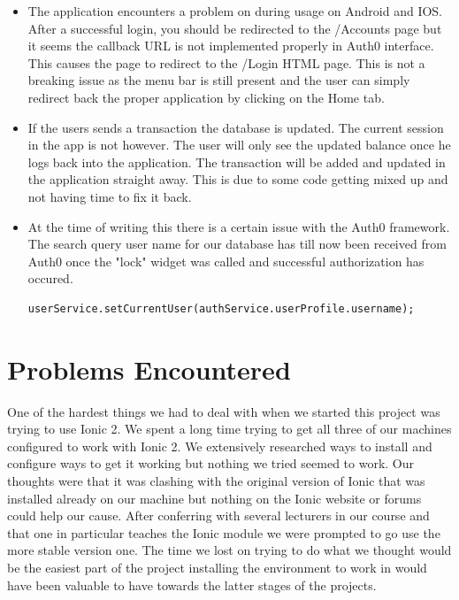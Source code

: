 \begin{itemize}
    \item The application encounters a problem on during usage on Android and IOS. After a successful login, you should be redirected to the /Accounts page but it seems the callback URL is not implemented properly in Auth0 interface. This causes the page to redirect to the /Login HTML page. This is not a breaking issue as the menu bar is still present and the user can simply redirect back the proper application by clicking on the Home tab.
    \item If the users sends a transaction the database is updated. The current session in the app is not however. The user will only see the updated balance once he logs back into the application. The transaction will be added and updated in the application straight away.
    This is due to some code getting mixed up and not having time to fix it back.
    \item At the time of writing this there is a certain issue with the Auth0 framework.
    The search query user name for our database has till now been received from Auth0 once the "lock" widget was called and successful authorization has occured.
\begin{verbatim}
userService.setCurrentUser(authService.userProfile.username);
\end{verbatim}

\end{itemize}

\section{Problems Encountered}
One of the hardest things we had to deal with when we started this project was trying to use Ionic 2. We spent a long time trying to get all three of our machines configured to work with Ionic 2. We extensively researched ways to install and configure ways to get it working but nothing we tried seemed to work. Our thoughts were that it was clashing with the original version of Ionic that was installed already on our machine but nothing on the Ionic website or forums could help our cause. After conferring with several lecturers in our course and that one in particular teaches the Ionic module we were prompted to go use the more stable version one. The time we lost on trying to do what we thought would be the easiest part of the project installing the environment to work in would have been valuable to have towards the latter stages of the projects.


